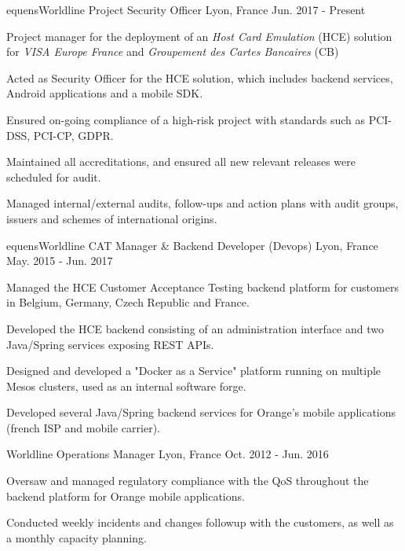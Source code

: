 \begin{cventries}
  \cventry
    {equensWorldline}
    {Project Security Officer}
    {Lyon, France}
    {Jun. 2017 - Present}
    {
      \begin{cvitems}
        \item {Project manager for the deployment of an \textit{Host Card Emulation} (HCE) solution for \textit{VISA Europe France} and \textit{Groupement des Cartes Bancaires} (CB)}
        \item {Acted as Security Officer for the HCE solution, which includes backend services, Android applications and a mobile SDK.}
        \item {Ensured on-going compliance of a high-risk project with standards such as PCI-DSS, PCI-CP, GDPR.}
        \item {Maintained all accreditations, and ensured all new relevant releases were scheduled for audit.}
        \item {Managed internal/external audits, follow-ups and action plans with audit groups, issuers and schemes of international origins.}
      \end{cvitems}
    }
  \cventry
    {equensWorldline}
    {CAT Manager \& Backend Developer (Devops)}
    {Lyon, France}
    {May. 2015 - Jun. 2017}
    {
      \begin{cvitems}
        \item {Managed the HCE Customer Acceptance Testing backend platform for customers in Belgium, Germany, Czech Republic and France.}
        \item {Developed the HCE backend consisting of an administration interface and two Java/Spring services exposing REST APIs.}
        \item {Designed and developed a "Docker as a Service" platform running on multiple Mesos clusters, used as an internal software forge.}
        \item {Developed several Java/Spring backend services for Orange's mobile applications (french ISP and mobile carrier).}
      \end{cvitems}
    }
  \cventry
    {Worldline}
    {Operations Manager}
    {Lyon, France}
    {Oct. 2012 - Jun. 2016}
    {
      \begin{cvitems}
        \item {Oversaw and managed regulatory compliance with the QoS throughout the backend platform for Orange mobile applications.}
        \item {Conducted weekly incidents and changes followup with the customers, as well as a monthly capacity planning.}

\end{cvitems}}
\end{cventries}
